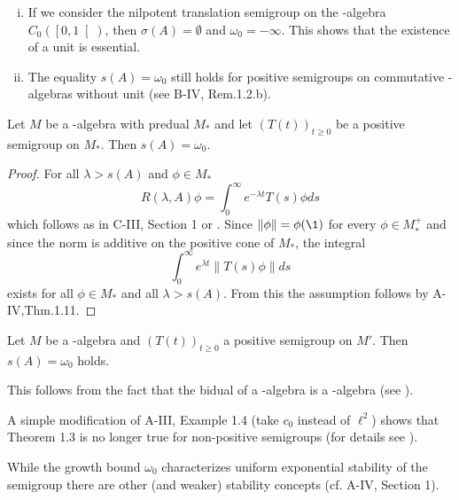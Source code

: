 \begin{remark}\label{rem:d4-1.2}
\begin{enumerate}[(i), wide]
\item
If we consider the nilpotent translation semigroup on the \CA-algebra $C_{0}( \left[0,1\right[ )$, then $\sigma(A) = \emptyset$ and $\omega_{0} = -\infty$.
This shows that the existence of a unit is essential.

\item
The equality $s(A) = \omega_{0}$ still holds for positive semigroups on commutative \CA-algebras without unit (see B-IV, Rem.1.2.b).
\end{enumerate}
\end{remark}
\begin{theorem}\label{thm:d4-1.3}
Let $M$ be a \WA-algebra with predual $M_{*}$ and let $(T(t))_{t \geq 0}$ be a positive semigroup on $M_{*}$.
Then $s(A) = \omega_{0}$.
\end{theorem}
\begin{proof}
For all $\lambda > s(A)$ and $\phi \in M_{*}$
\[
R(\lambda,A)\phi = \int_{0}^{\infty} e^{-\lambda t}T(s)\phi ds
\]
which follows as in C-III, Section 1 or \citet[Theorem 3]{greinervoigtwolff:1981}.
Since $\|\phi\| = \phi(\1)$ for every $\phi \in M_{*}^{+}$ and since the norm is additive on the positive cone of $M_{*}$, the integral
\[
	\int_{0}^{\infty} e^{\lambda t}\|T(s)\phi\|ds
\]
exists for all $\phi \in M_{*}$ and all $\lambda > s(A)$.
From this the assumption follows by A-IV,Thm.1.11.
\end{proof}
\begin{corollary}\label{cor:d4-1.4}
Let $M$ be a \CA-algebra and $(T(t))_{t \geq 0}$ a positive semigroup on $M'$.
Then $s(A) = \omega_{0}$ holds.
\end{corollary}
\noindent This follows from the fact that the bidual of a \CA-algebra is a \WA-algebra (see \citet[Theorem III.2.4.]{takesaki:1979}).
\begin{remark}\label{rem:d4-1.5}
A simple modification of A-III, Example 1.4 (take $c_{0}$ instead of $\ell^2$) shows that Theorem 1.3 is no longer true for non-positive semigroups (for details see \citet[Beispiel 2.5]{grohneubrander:1981}).

While the growth bound $\omega_{0}$ characterizes uniform exponential stability of the semigroup there are other (and weaker) stability concepts (cf. A-IV, Section 1).
\end{remark}
